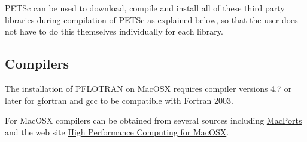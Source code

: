 PETSc can be used to download, compile and install all of these third party libraries during compilation of PETSc as explained below, so that the user does not have to do this themselves individually for each library.

\subsection{Compilers}

The installation of PFLOTRAN on MacOSX requires compiler versions 4.7 or later for gfortran and gcc to be compatible with Fortran 2003. 

For MacOSX compilers can be obtained from several sources including \href{http://www.macports.org/}{MacPorts} and the web site \href{http://hpc.sourceforge.net/}{High Performance Computing for MacOSX}.

